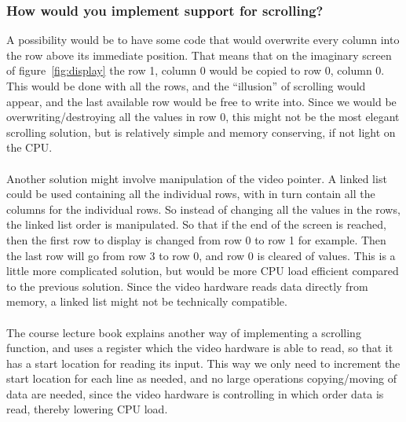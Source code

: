 \subsubsection*{How would you implement support for scrolling?}
A possibility would be to have some code that would overwrite every column into the row above its immediate position.  That means that on the imaginary screen of figure~\ref{fig:display} the row 1, column 0 would be copied to row 0, column 0. This would be done with all the rows, and the ``illusion'' of scrolling would appear, and the last available row would be free to write into. Since we would be overwriting/destroying all the values in row 0, this might not be the most elegant scrolling solution, but is relatively simple and memory conserving, if not light on the CPU.\\
\\
Another solution might involve manipulation of the video pointer. A linked list could be used containing all the individual rows, with in turn contain all the columns for the individual rows. So instead of changing all the values in the rows, the linked list order is manipulated. So that if the end of the screen is reached, then the first row to display is changed from row 0 to row 1 for example. Then the last row will go from row 3 to row 0, and row 0 is cleared of values. This is a little more complicated solution, but would be more CPU load efficient compared to the previous solution. Since the video hardware reads data directly from memory, a linked list might not be technically compatible.\\
\\
The course lecture book explains another way of implementing a scrolling function, and uses a register which the video hardware is able to read, so that it has a start location for reading its input. This way we only need to increment the start location for each line as needed, and no large operations copying/moving of data are needed, since the video hardware is controlling in which order data is read, thereby lowering CPU load.
	